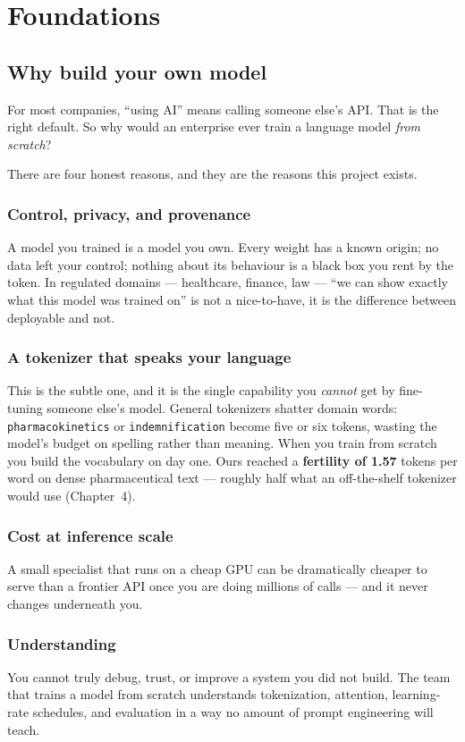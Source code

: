 \part{Foundations}

\chapter{Why build your own model}

For most companies, ``using AI'' means calling someone else's API. That is the right default. So why would
an enterprise ever train a language model \emph{from scratch}?

There are four honest reasons, and they are the reasons this project exists.

\section{Control, privacy, and provenance}
A model you trained is a model you own. Every weight has a known origin; no data left your control; nothing
about its behaviour is a black box you rent by the token. In regulated domains --- healthcare, finance, law
--- ``we can show exactly what this model was trained on'' is not a nice-to-have, it is the difference
between deployable and not.

\section{A tokenizer that speaks your language}
This is the subtle one, and it is the single capability you \emph{cannot} get by fine-tuning someone else's
model. General tokenizers shatter domain words: \texttt{pharmacokinetics} or \texttt{indemnification} become
five or six tokens, wasting the model's budget on spelling rather than meaning. When you train from scratch
you build the vocabulary on day one. Ours reached a \textbf{fertility of 1.57} tokens per word on dense
pharmaceutical text --- roughly half what an off-the-shelf tokenizer would use (Chapter~4).

\section{Cost at inference scale}
A small specialist that runs on a cheap GPU can be dramatically cheaper to serve than a frontier API once
you are doing millions of calls --- and it never changes underneath you.

\section{Understanding}
You cannot truly debug, trust, or improve a system you did not build. The team that trains a model from
scratch understands tokenization, attention, learning-rate schedules, and evaluation in a way no amount of
prompt engineering will teach.

